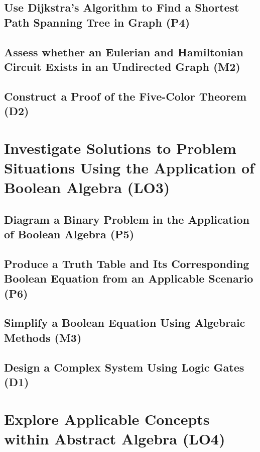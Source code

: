 \documentclass[12pt, a4paper, twoside]{report} %
\begin{document}
\section{Use Dijkstra’s Algorithm to Find a Shortest Path Spanning Tree in Graph (P4)}
\label{sec:P4}

\section{Assess whether an Eulerian and Hamiltonian Circuit Exists in an Undirected Graph (M2)}
\label{sec:M2}

\section{Construct a Proof of the Five-Color Theorem (D2)}
\label{sec:D2}

\chapter{Investigate Solutions to Problem Situations Using the Application of Boolean Algebra (LO3)}
\label{chap:LO3}

\section{Diagram a Binary Problem in the Application of Boolean Algebra (P5)}
\label{sec:P5}

\section{Produce a Truth Table and Its Corresponding Boolean Equation from an Applicable Scenario (P6)}
\label{sec:P6}

\section{Simplify a Boolean Equation Using Algebraic Methods (M3)}
\label{sec:M3}

\section{Design a Complex System Using Logic Gates (D1)}
\label{sec:D1}

\chapter{Explore Applicable Concepts within Abstract Algebra (LO4)}
\label{chap:LO4}
\end{document}
